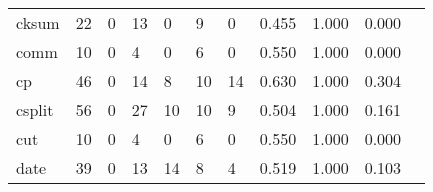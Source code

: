 \begin{longtable}{lp{1.2cm}p{1.2cm}p{1.2cm}p{1.2cm}p{1.2cm}p{1.2cm}p{1.2cm}p{1.2cm}p{1.2cm}p{1.2cm}}
cksum     &                                    22 &                                                  0 &                                                 13 &                                                  0 &                                                  9 &                                                  0 &                                         0.455 &                                              1.000 &                                              0.000 \\
comm      &                                    10 &                                                  0 &                                                  4 &                                                  0 &                                                  6 &                                                  0 &                                         0.550 &                                              1.000 &                                              0.000 \\
cp        &                                    46 &                                                  0 &                                                 14 &                                                  8 &                                                 10 &                                                 14 &                                         0.630 &                                              1.000 &                                              0.304 \\
csplit    &                                    56 &                                                  0 &                                                 27 &                                                 10 &                                                 10 &                                                  9 &                                         0.504 &                                              1.000 &                                              0.161 \\
cut       &                                    10 &                                                  0 &                                                  4 &                                                  0 &                                                  6 &                                                  0 &                                         0.550 &                                              1.000 &                                              0.000 \\
date      &                                    39 &                                                  0 &                                                 13 &                                                 14 &                                                  8 &                                                  4 &                                         0.519 &                                              1.000 &                                              0.103 \\

\end{longtable}

